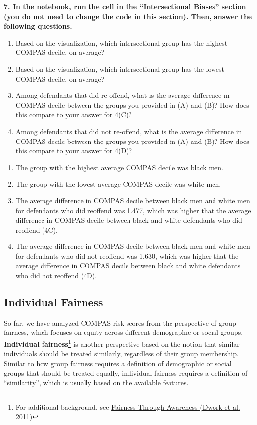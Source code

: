\documentclass{article}
\begin{document}
\textbf{7. In the notebook, run the cell in the ``Intersectional Biases'' section (you do not need to change the code in this section). Then, answer the following questions.}
\begin{enumerate}[label=\Alph*.]
\item Based on the visualization, which intersectional group has the highest COMPAS decile, on average?
\item Based on the visualization, which intersectional group has the lowest COMPAS decile, on average?
\item Among defendants that did re-offend, what is the average difference in COMPAS decile between the groups you provided in (A) and (B)? How does this compare to your answer for 4(C)?
\item Among defendants that did not re-offend, what is the average difference in COMPAS decile between the groups you provided in (A) and (B)? How does this compare to your answer for 4(D)?
\end{enumerate}

\bigskip
\begin{mdframed}
\begin{enumerate}[label=\Alph*.]
\item The group with the highest average COMPAS decile was black men.
\item The group with the lowest average COMPAS decile was white men.
\item The average difference in COMPAS decile between black men and white men for defendants who did reoffend was 1.477, which was higher that the average difference in COMPAS decile between black and white defendants who did reoffend (4C).
\item The average difference in COMPAS decile between black men and white men for defendants who did not reoffend was 1.630, which was higher that the average difference in COMPAS decile between black and white defendants who did not reoffend (4D).
\end{enumerate}
\end{mdframed}
\bigskip

\subsection*{Individual Fairness}

So far, we have analyzed COMPAS risk scores from the perspective of group fairness, which focuses on equity across different demographic or social groups. \textbf{Individual fairness}\footnote{For additional background, see \href{https://arxiv.org/pdf/1104.3913}{Fairness Through Awareness (Dwork et al. 2011)}} is another perspective based on the notion that similar individuals should be treated similarly, regardless of their group membership. Similar to how group fairness requires a definition of demographic or social groups that should be treated equally, individual fairness requires a definition of ``similarity'', which is usually based on the available features. 
\end{document}
